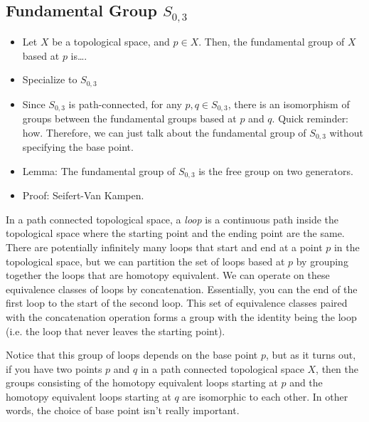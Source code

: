 \documentclass{amsart}
\begin{document}
	\subsection{Fundamental Group $S_{0,3}$}
	
	
	\begin{tcolorbox}
		\begin{itemize}
			\item Let $X$ be a topological space, and $p\in X$. Then, the fundamental group of $X$ based at $p$ is\dots.
			\item Specialize to $S_{0,3}$
			\item Since $S_{0,3}$ is path-connected, for any $p,q\in S_{0,3}$, there is an isomorphism of groups between the fundamental groups based at $p$ and $q$. Quick reminder: how. Therefore, we can just talk about the fundamental group of $S_{0,3}$ without specifying the base point.
			\item Lemma: The fundamental group of $S_{0,3}$ is the free group on two generators.
			\item Proof: Seifert-Van Kampen.
		\end{itemize}
	\end{tcolorbox}
	
	In a path connected topological space, a \emph{loop} is a continuous path inside the topological space where the starting point and the ending point are the same. There are potentially infinitely many loops that start and end at a point $p$ in the topological space, but we can partition the set of loops based at $p$ by grouping together the loops that are homotopy equivalent. We can operate on these equivalence classes of loops by concatenation. Essentially, you can  the end of the first loop to the start of the second loop. This set of equivalence classes paired with the concatenation operation forms a group with the identity being the  loop (i.e. the loop that never leaves the starting point). 
	
	Notice that this group of loops depends on the base point $p$, but as it turns out, if you have two points $p$ and $q$ in a path connected topological space $X$, then the groups consisting of the homotopy equivalent loops starting at $p$ and the homotopy equivalent loops starting at $q$ are isomorphic to each other. In other words, the choice of base point isn't really important.
	
\end{document}
